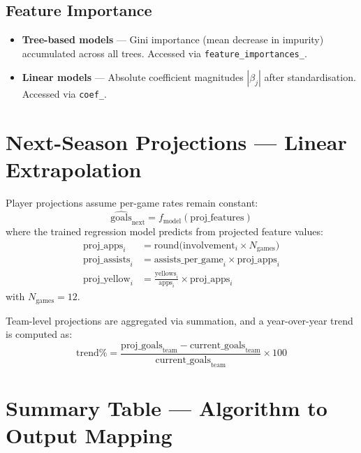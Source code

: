 \documentclass[11pt,a4paper]{article}
\begin{document}
\subsection{Feature Importance}

\begin{itemize}[nosep]
  \item \textbf{Tree-based models} --- Gini importance (mean decrease in
        impurity) accumulated across all trees.  Accessed via
        \texttt{feature\_importances\_}.
  \item \textbf{Linear models} --- Absolute coefficient magnitudes
        $|\beta_j|$ after standardisation.  Accessed via
        \texttt{coef\_}.
\end{itemize}


\section{Next-Season Projections --- Linear Extrapolation}

Player projections assume per-game rates remain constant:
\[
  \widehat{\text{goals}}_{\text{next}} = f_{\text{model}}(\text{proj\_features})
\]
where the trained regression model predicts from projected feature values:
\begin{align*}
  \text{proj\_apps}_i &= \text{round}\!\bigl(\text{involvement}_i \times N_{\text{games}}\bigr) \\
  \text{proj\_assists}_i &= \text{assists\_per\_game}_i \times \text{proj\_apps}_i \\
  \text{proj\_yellow}_i &= \frac{\text{yellows}_i}{\text{apps}_i} \times \text{proj\_apps}_i
\end{align*}
with $N_{\text{games}} = 12$.

Team-level projections are aggregated via summation, and a year-over-year
trend is computed as:
\[
  \text{trend}\% = \frac{\text{proj\_goals}_{\text{team}} - \text{current\_goals}_{\text{team}}}
    {\text{current\_goals}_{\text{team}}} \times 100
\]


\section{Summary Table --- Algorithm to Output Mapping}
\end{document}
